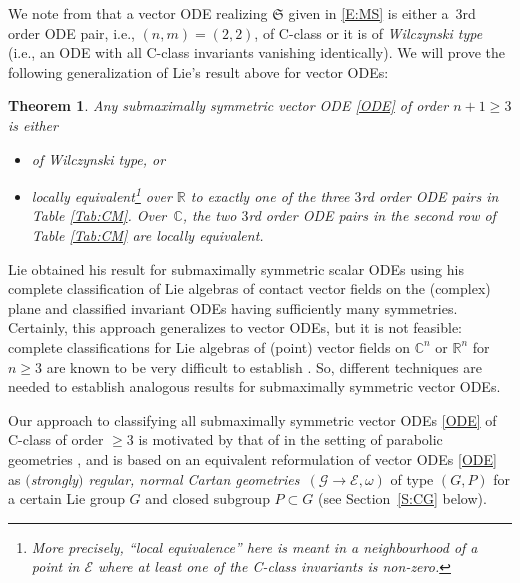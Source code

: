 \documentclass[pdftex]{sigma}%
\newcommand\cG{\mathcal{G}}
\newcommand\fS{\mathfrak{S}}
\newcommand{\R}{\mathbb{R}}
\newcommand{\C}{\mathbb{C}}
\newcommand\cE{\mathcal{E}}
\numberwithin{equation}{section}
\newtheorem{Theorem}{Theorem}[section]
\begin{document}
We note from \cite[Tables 8 and~10]{KT2021} that a vector ODE realizing $\fS$ given in \eqref{E:MS} is either a~3rd order ODE pair, i.e., $(n,m) = (2,2)$, of C-class or it is of {\em Wilczynski type} (i.e., an ODE with all C-class invariants vanishing identically). We will prove the following generalization of Lie's result above for vector ODEs:

\begin{Theorem} \label{T:I}
Any submaximally symmetric vector ODE \eqref{ODE} of order $n+1 \ge 3$ is either
\begin{itemize}\itemsep=0pt
\item[$(a)$] of Wilczynski type, or
\item[$(b)$] locally equivalent\footnote{More precisely, ``local equivalence'' here is meant in a neighbourhood of a point in $\cE$ where at least one of the C-class invariants is non-zero.} over $\R$ to exactly one of the three $3$rd order ODE pairs in Table {\rm \ref{Tab:CM}}. Over~$\C$, the two $3$rd order ODE pairs in the second row of Table {\rm \ref{Tab:CM}} are locally equivalent.
\end{itemize}
\end{Theorem}

Lie obtained his result for submaximally symmetric scalar ODEs using his complete classification of Lie algebras of contact vector fields on the (complex) plane and classified invariant ODEs having sufficiently many symmetries. Certainly, this approach generalizes to vector ODEs, but it is not feasible: complete classifications for Lie algebras of (point) vector fields on $\C^n$ or $\R^n$ for $n \ge 3$ are known to be very difficult to establish \cite{Doubrov2017,Schneider2018}. So, different techniques are needed to establish analogous results for submaximally symmetric vector ODEs.

Our approach to classifying all submaximally symmetric vector ODEs \eqref{ODE} of C-class of order $\ge 3$ is motivated by that of \cite{The2021, The2022} in the setting of parabolic geometries \cite{CS2009}, and is based on an equivalent reformulation of vector ODEs \eqref{ODE} as {\em $($strongly$)$ regular, normal Cartan ge\-ome\-tries}~$(\cG \to \cE, \omega)$ of type $(G,P)$ for a certain Lie group $G$ and closed subgroup $P \subset G$ \cite{CDT2020,Doubrov2001,DKM1999} (see Section~\ref{S:CG} below).
\end{document}
